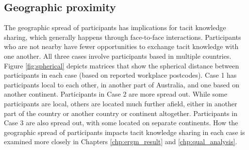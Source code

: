 \subsection{Geographic proximity}

The geographic spread of participants has implications for tacit knowledge sharing, which generally happens through face-to-face interactions. Participants who are not nearby have fewer opportunities to exchange tacit knowledge with one another. All three cases involve participants based in multiple countries. Figure \ref{fig:spherical} depicts matrices that show the spherical distance between participants in each case (based on reported workplace postcodes). Case 1 has participants local to each other, in another part of Australia, and one based on another continent. Participants in Case 2 are more spread out. While some participants are local, others are located much further afield, either in another part of the country or another country or continent altogether. Participants in Case 3 are also spread out, with some located on separate continents. How the geographic spread of participants impacts tacit knowledge sharing in each case is examined more closely in Chapters \ref{chp:ergm_result} and \ref{chp:qual_analysis}.  \medskip

